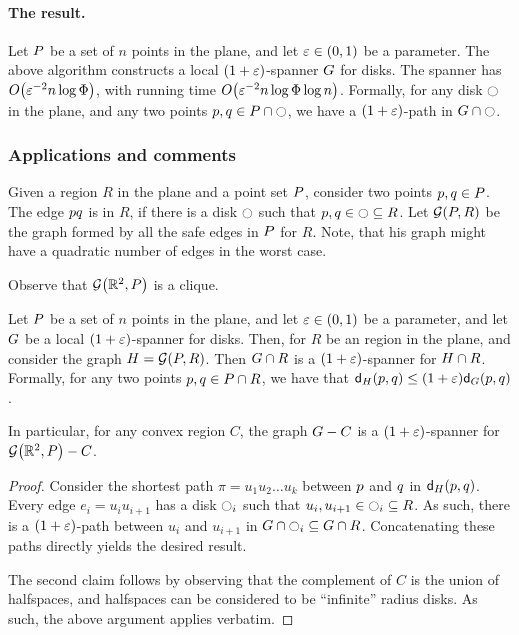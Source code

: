 \documentclass[12pt]{article}%
\begin{document}
\paragraph{The result.}

\begin{theorem}
    Let $P$ be a set of $n$ points in the plane, and let
    $\varepsilon \in (0,1)$ be a parameter. The above algorithm constructs a
    local $(1+\varepsilon)$-spanner $G$ for disks. The spanner has
    $O\pth{ \eps^{-2} n\log \spread }$, with running time
    $O\pth{ \eps^{-2} n\log \spread \log n }$.  Formally, for any disk
    $\ocircle$ in the plane, and any two points
    $p, q \in P \cap \ocircle$, we have a $(1+\varepsilon)$-path in
    $G \cap {\ocircle}$.
\end{theorem}

\subsubsection{Applications and comments}


\begin{defn}
    Given a region $R$ in the plane and a point set $P$, consider
    two points $p, q \in P$. The edge $p q$ is 
    in $R$, if there is a disk $\ocircle$ such that
    $p,q \in \ocircle \subseteq R$. Let $\GY{\PS}{R}$ be the graph
    formed by all the safe edges in $P$ for $R$. Note, that his
    graph might have a quadratic number of edges in the worst case.
\end{defn}

Observe that $\GY{\Re^2}{\PS}$ is a clique.

\begin{corollary}
    Let $P$ be a set of $n$ points in the plane, and let
    $\varepsilon \in (0,1)$ be a parameter, and let $G$ be a local
    $(1+\varepsilon)$-spanner for disks. Then, for $R$ be an region in the
    plane, and consider the graph $\GA = \GY{\PS}{R}$. Then
    $G \cap {R}$ is a $(1+\varepsilon)$-spanner for
    $H \cap {R}$. Formally, for any two points
    $p, q \in P \cap R$, we have that
    $\dGZ{\GA}{\pa}{\pb} \leq (1+\eps)\dGZ{\G}{\pa}{\pb}$.

    In particular, for any convex region $C$, the graph $G - C$
    is a $(1+\varepsilon)$-spanner for $\GY{\Re^2}{\PS} \gminus C$.
\end{corollary}
\begin{proof}
    Consider the shortest path $\pi = u_1 u_2 \ldots u_k$ between
    $p$ and $q$ in $\dGZ{\GA}{\pa}{\pb}$. Every edge
    $e_i = u_i u_{i+1}$ has a disk $\ocircle_i$ such that
    $u_i, u_{i+1} \in \ocircle_i \subseteq R$. As such, there is a
    $(1+\varepsilon)$-path between $u_i$ and $u_{i+1}$ in
    $G \cap {\ocircle_i} \subseteq
    G \cap {R}$. Concatenating these paths directly yields the
    desired result.

    The second claim follows by observing that the complement of $C$
    is the union of halfspaces, and halfspaces can be considered to be
    ``infinite'' radius disks. As such, the above argument applies
    verbatim.
\end{proof}
\end{document}
